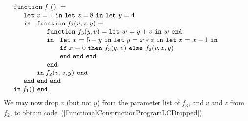\begin{equation}
\label{FunctionalConstructionProgramLC1}
\begin{array}{l}
\mathtt{function}\ f_1()\ = \\
  \quad
  \begin{array}{l}
     \mathtt{let}\ v = 1 \ 
     \mathtt{in\ let}\ z = 8 \ 
     \mathtt{in\ let}\ y = 4\\
     \mathtt{in}\ 
     \begin{array}[t]{l}
       \mathtt{function}\ f_2(v,z,y) = \\
       \quad \begin{array}{l}  
               \mathtt{function}\ f_3(y,v) = \letin w {y+v} w\\
               \mathtt{in}\
               \begin{array}[t]{l}
                  \letinD x {5+y} {
                  \letinD y {x*z} {
                   \letinD x {x-1} {}}}\\ 
                  \ite {x=0} {\call {f_3} {y,v}}
                     {\call {f_2} {v,z,y}}\\
                  \mathtt{end}\ \mathtt{end}\ \mathtt{end}
               \end{array}\\
               \mathtt{end}
             \end{array}\\
       \mathtt{in}\ f_2(v,z,y)\ \mathtt{end}
     \end{array}\\
     \mathtt{end}\ \mathtt{end}\ \mathtt{end}
  \end{array}\\
  \mathtt{in}\ f_1()\ \mathtt{end}
\end{array}
\end{equation}
We may now drop $v$ (but not $y$) from the parameter list of $f_3$,
and $v$ and $z$ from $f_2$, to obtain
code~(\ref{FunctionalConstructionProgramLCDropped}).
